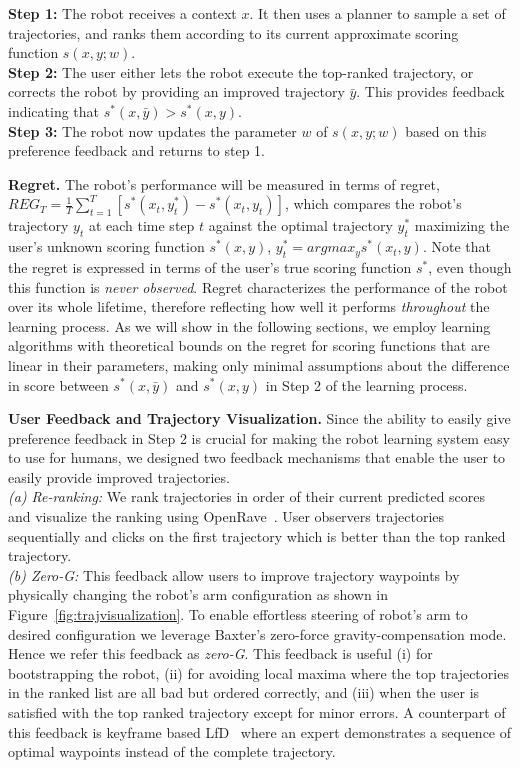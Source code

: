 \textbf{Step 1:} The robot receives a context $x$. It then uses a planner to sample a set of trajectories, and ranks them according to its current approximate scoring function $s(x,y;w)$.\\
\textbf{Step 2:} The user either lets the robot execute the top-ranked trajectory, or corrects the robot by providing an improved trajectory $\bar{y}$. This provides feedback indicating that $s^*(x,\bar{y}) > s^*(x,y)$.\\
\textbf{Step 3:}  The robot now updates the parameter $w$ of $s(x,y;w)$ based on this preference feedback and returns to step 1.

\textbf{Regret.} The robot's performance will be measured in terms of regret, $REG_T = \frac{1}{T} \sum_{t=1}^T [ s^*(x_t,{y}^*_t) - s^*(x_t,{y}_t) ]$, which compares the robot's trajectory ${y}_t$ at each time step $t$ against the optimal trajectory ${y}_t^*$ maximizing the user's unknown scoring function $s^*(x,{y})$, ${y}_t^* = argmax_{y} s^*(x_t,{y})$. Note that the regret is expressed in terms of the user's true scoring function $s^*$, even though this function is \emph{never observed}. Regret characterizes the performance of the robot over its whole lifetime, therefore reflecting how well it performs \emph{throughout} the learning process. As we will show in the following sections, we employ learning algorithms with theoretical bounds on the regret for scoring functions that are linear in their parameters, making only minimal assumptions about the difference in score between $s^*(x,\bar{y})$ 
and $s^*(x,y)$ in Step 2 of the learning process. 

\textbf{User Feedback and Trajectory Visualization.\label{subsec:tajgen}} 
Since the ability to easily give preference feedback in Step 2 is crucial for making the robot learning system easy to use for humans, we designed two feedback mechanisms that enable the user to easily provide improved trajectories.\\
\textit{(a) Re-ranking:} We rank trajectories in order of their current predicted scores and visualize the ranking using OpenRave~\citep{Diankov10}. User observers trajectories sequentially and clicks on the first trajectory which is better than the top ranked trajectory.\\

\textit{(b) Zero-G:} This feedback allow users to improve trajectory waypoints by physically changing the robot's arm configuration as shown in Figure~\ref{fig:trajvisualization}. 
To enable effortless steering of robot's arm to desired configuration we leverage Baxter's zero-force gravity-compensation mode. Hence we refer this feedback as \emph{zero-G}.
This feedback is useful (i) for bootstrapping the robot, (ii) for avoiding local maxima where the top trajectories in the ranked list are all bad but ordered correctly, and (iii) when the user is satisfied with the top ranked trajectory except for minor errors. A counterpart of this feedback is keyframe based LfD~\citep{Akgun12} where an expert demonstrates a sequence of optimal waypoints instead of the complete trajectory.

